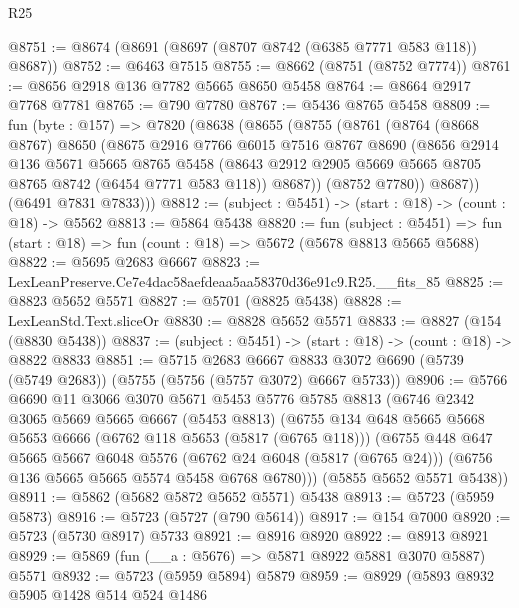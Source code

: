 \begin{lexlean}{R25}
\begin{coremodule}
@8751 := @8674 (@8691 (@8697 (@8707 @8742 (@6385 @7771 @583 @118)) @8687))
@8752 := @6463 @7515
@8755 := @8662 (@8751 (@8752 @7774))
@8761 := @8656 @2918 @136 @7782 @5665 @8650 @5458
@8764 := @8664 @2917 @7768 @7781
@8765 := @790 @7780
@8767 := @5436 @8765 @5458
@8809 := fun (byte : @157) =>
  @7820
    (@8638
      (@8655
        (@8755
          (@8761
            (@8764
              (@8668 @8767)
              @8650
              (@8675
                @2916
                @7766
                @6015
                @7516
                @8767
                @8690
                (@8656
                  @2914
                  @136
                  @5671
                  @5665
                  @8765
                  @5458
                  (@8643 @2912 @2905 @5669 @5665 @8705 @8765 @8742 (@6454 @7771 @583 @118))
                  @8687))
              (@8752 @7780))
            @8687))
        (@6491 @7831 @7833)))
@8812 := (subject : @5451) -> (start : @18) -> (count : @18) -> @5562
@8813 := @5864 @5438
@8820 := fun (subject : @5451) =>
  fun (start : @18) => fun (count : @18) => @5672 (@5678 @8813 @5665 @5688)
@8822 := @5695 @2683 @6667
@8823 := LexLeanPreserve.Ce7e4dac58aefdeaa5aa58370d36e91c9.R25.__fits_85
@8825 := @8823 @5652 @5571
@8827 := @5701 (@8825 @5438)
@8828 := LexLeanStd.Text.sliceOr
@8830 := @8828 @5652 @5571
@8833 := @8827 (@154 (@8830 @5438))
@8837 := (subject : @5451) -> (start : @18) -> (count : @18) -> @8822 @8833
@8851 := @5715
    @2683
    @6667
    @8833
    @3072
    @6690
    (@5739 (@5749 @2683))
    (@5755 (@5756 (@5757 @3072) @6667 @5733))
@8906 := @5766
    @6690
    @11
    @3066
    @3070
    @5671
    @5453
    @5776
    @5785
    @8813
    (@6746
      @2342
      @3065
      @5669
      @5665
      @6667
      (@5453 @8813)
      (@6755
        @134
        @648
        @5665
        @5668
        @5653
        @6666
        (@6762 @118 @5653 (@5817 (@6765 @118)))
        (@6755
          @448
          @647
          @5665
          @5667
          @6048
          @5576
          (@6762 @24 @6048 (@5817 (@6765 @24)))
          (@6756 @136 @5665 @5665 @5574 @5458 @6768 @6780)))
      (@5855 @5652 @5571 @5438))
@8911 := @5862 (@5682 @5872 @5652 @5571) @5438
@8913 := @5723 (@5959 @5873)
@8916 := @5723 (@5727 (@790 @5614))
@8917 := @154 @7000
@8920 := @5723 (@5730 @8917) @5733
@8921 := @8916 @8920
@8922 := @8913 @8921
@8929 := @5869 (fun (__a : @5676) => @5871 @8922 @5881 @3070 @5887) @5571
@8932 := @5723 (@5959 @5894) @5879
@8959 := @8929
    (@5893
      @8932
      @5905
      @1428
      @514
      @524
      @1486

\end{coremodule}
\end{lexlean}
